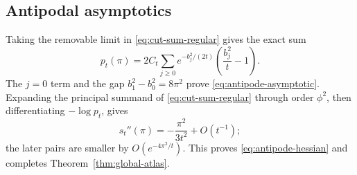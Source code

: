 \subsection*{Antipodal asymptotics}
Taking the removable limit in \eqref{eq:cut-sum-regular} gives the exact sum
\begin{equation}\label{eq:antipode-exact}
 p_t(\pi)=2C_t\sum_{j\ge0}e^{-b_j^2/(2t)}
 \left(\frac{b_j^2}{t}-1\right).
\end{equation}
The $j=0$ term and the gap $b_1^2-b_0^2=8\pi^2$ prove
\eqref{eq:antipode-asymptotic}.  Expanding the principal summand of
\eqref{eq:cut-sum-regular} through order $\phi^2$, then differentiating
$-\log p_t$, gives
\[
 s_t''(\pi)=-\frac{\pi^2}{3t^2}+O(t^{-1});
\]
the later pairs are smaller by $O(e^{-4\pi^2/t})$.  This proves
\eqref{eq:antipode-hessian} and completes Theorem~\ref{thm:global-atlas}.
